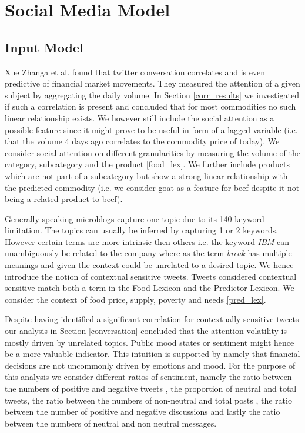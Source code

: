 \clearpage

\section{Social Media Model}

\subsection{Input Model }

Xue Zhanga et al. found that twitter conversation correlates and is even predictive of financial market movements. They measured the attention of a given subject by aggregating the daily volume. In Section \ref{corr_results} we investigated if such a correlation is present and concluded that for most commodities no such linear relationship exists. We however still include the social attention as a possible feature since it might prove to be useful in form of a lagged variable (i.e. that the volume 4 days ago  correlates to the commodity price of today). We consider social attention on different granularities  by measuring the volume of the category, subcategory and the product \ref{food_lex}. We further include products which are not part of a subcategory but show a strong linear relationship with the predicted commodity (i.e. we consider goat as a feature for beef despite it not being a related product to beef). 

 Generally speaking microblogs capture one topic due to its 140 keyword limitation. The topics can usually be inferred by capturing 1 or 2 keywords. However certain terms are more intrinsic then others i.e. the keyword \emph{IBM} can unambiguously be related to the company where as the  term \emph{break} has multiple meanings and given the context could be unrelated to a desired topic. We hence introduce the notion of contextual sensitive tweets. Tweets considered contextual sensitive match both a term in the Food Lexicon and the Predictor Lexicon. We consider the context of food price, supply, poverty and needs \ref{pred_lex}. 
 
 
 Despite having identified  a significant correlation for contextually sensitive tweets our analysis in Section \ref{conversation} concluded that the attention volatility is mostly driven by unrelated topics. Public mood states or sentiment might hence be a more valuable indicator. This intuition is supported by \cite{nofsinger05} namely that financial decisions are not uncommonly driven by emotions and mood. For the purpose of this analysis we consider different ratios of sentiment, namely the ratio between the numbers of positive and negative tweets \cite{Nguyen12}, the proportion of neutral and total tweets,  the ratio between the numbers of non-neutral and total posts \cite{Zhang09}, the ratio between the number of positive and negative discussions and lastly the ratio between the numbers of neutral and non neutral messages. 

